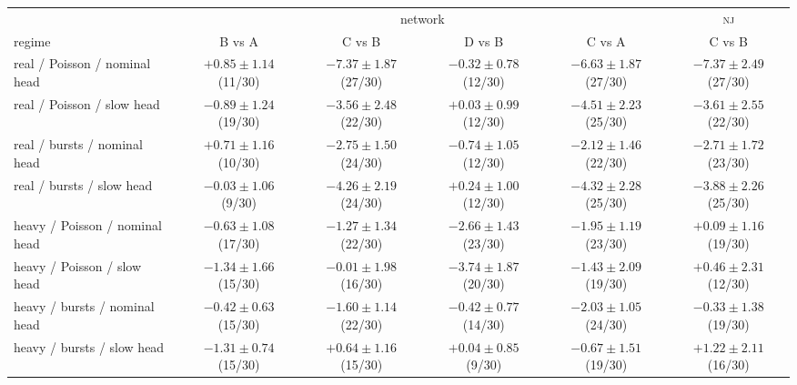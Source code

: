 \begin{tabular}{@{}lcccc|c@{}}
\toprule
 & \multicolumn{4}{c|}{network} & \textsc{nj} \\
regime & B vs A & C vs B & D vs B & C vs A & C vs B \\
\midrule
real / Poisson / nominal head & $+0.85 \pm 1.14$ (11/30) & {\boldmath$-7.37 \pm 1.87$} (27/30) & $-0.32 \pm 0.78$ (12/30) & {\boldmath$-6.63 \pm 1.87$} (27/30) & {\boldmath$-7.37 \pm 2.49$} (27/30) \\
real / Poisson / slow head & $-0.89 \pm 1.24$ (19/30) & {\boldmath$-3.56 \pm 2.48$} (22/30) & $+0.03 \pm 0.99$ (12/30) & {\boldmath$-4.51 \pm 2.23$} (25/30) & {\boldmath$-3.61 \pm 2.55$} (22/30) \\
real / bursts / nominal head & $+0.71 \pm 1.16$ (10/30) & {\boldmath$-2.75 \pm 1.50$} (24/30) & $-0.74 \pm 1.05$ (12/30) & {\boldmath$-2.12 \pm 1.46$} (22/30) & {\boldmath$-2.71 \pm 1.72$} (23/30) \\
real / bursts / slow head & $-0.03 \pm 1.06$ (9/30) & {\boldmath$-4.26 \pm 2.19$} (24/30) & $+0.24 \pm 1.00$ (12/30) & {\boldmath$-4.32 \pm 2.28$} (25/30) & {\boldmath$-3.88 \pm 2.26$} (25/30) \\
heavy / Poisson / nominal head & $-0.63 \pm 1.08$ (17/30) & $-1.27 \pm 1.34$ (22/30) & {\boldmath$-2.66 \pm 1.43$} (23/30) & {\boldmath$-1.95 \pm 1.19$} (23/30) & $+0.09 \pm 1.16$ (19/30) \\
heavy / Poisson / slow head & $-1.34 \pm 1.66$ (15/30) & $-0.01 \pm 1.98$ (16/30) & {\boldmath$-3.74 \pm 1.87$} (20/30) & $-1.43 \pm 2.09$ (19/30) & $+0.46 \pm 2.31$ (12/30) \\
heavy / bursts / nominal head & $-0.42 \pm 0.63$ (15/30) & {\boldmath$-1.60 \pm 1.14$} (22/30) & $-0.42 \pm 0.77$ (14/30) & {\boldmath$-2.03 \pm 1.05$} (24/30) & $-0.33 \pm 1.38$ (19/30) \\
heavy / bursts / slow head & {\boldmath$-1.31 \pm 0.74$} (15/30) & $+0.64 \pm 1.16$ (15/30) & $+0.04 \pm 0.85$ (9/30) & $-0.67 \pm 1.51$ (19/30) & $+1.22 \pm 2.11$ (16/30) \\
\bottomrule
\end{tabular}
